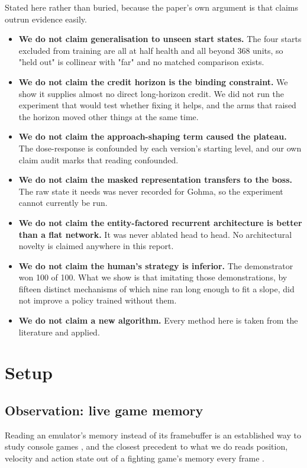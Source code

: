 \documentclass[11pt]{article}
\begin{document}
Stated here rather than buried, because the paper's own argument is that claims outrun evidence easily.

\begin{itemize}
\item \textbf{We do not claim generalisation to unseen start states.} The four starts excluded from training are all at half health and all beyond 368 units, so "held out" is collinear with "far" and no matched comparison exists.
\item \textbf{We do not claim the credit horizon is the binding constraint.} We show it supplies almost no direct long-horizon credit. We did not run the experiment that would test whether fixing it helps, and the arms that raised the horizon moved other things at the same time.
\item \textbf{We do not claim the approach-shaping term caused the plateau.} The dose-response is confounded by each version's starting level, and our own claim audit marks that reading confounded.
\item \textbf{We do not claim the masked representation transfers to the boss.} The raw state it needs was never recorded for Gohma, so the experiment cannot currently be run.
\item \textbf{We do not claim the entity-factored recurrent architecture is better than a flat network.} It was never ablated head to head. No architectural novelty is claimed anywhere in this report.
\item \textbf{We do not claim the human's strategy is inferior.} The demonstrator won 100 of 100. What we show is that imitating those demonstrations, by fifteen distinct mechanisms of which nine ran long enough to fit a slope, did not improve a policy trained without them.
\item \textbf{We do not claim a new algorithm.} Every method here is taken from the literature and applied.
\end{itemize}


\section{Setup}
\label{sec:2}

\subsection{Observation: live game memory}
\label{sec:2.1}

Reading an emulator's memory instead of its framebuffer is an established way to study console games \cite{bellemare2013ale,nichol2018gymretro}, and the closest precedent to what we do reads position, velocity and action state out of a fighting game's memory every frame \cite{firoiu2017melee}.
\end{document}
